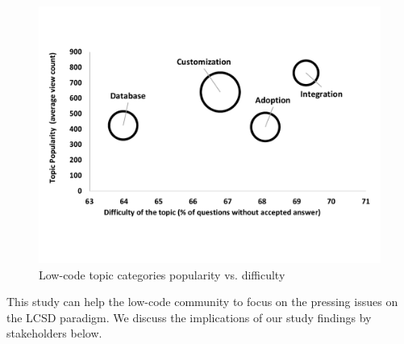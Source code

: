 \begin{figure}[t]
\vspace{-5mm}
\includegraphics[scale=0.36]{res/popularity_difficulty_bubble_chart.pdf}
\vspace{-15mm}
\caption{Low-code topic categories popularity vs. difficulty}
\label{fig:bubble_diff_pop_per_category}
\end{figure}



This study can help the low-code community to focus on the pressing issues on the
LCSD paradigm. We discuss the implications of our study findings by stakeholders below.

